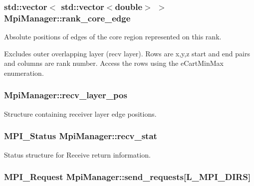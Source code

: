 \subsubsection[{\texorpdfstring{rank\+\_\+core\+\_\+edge}{rank_core_edge}}]{\setlength{\rightskip}{0pt plus 5cm}std\+::vector$<$ std\+::vector$<$double$>$ $>$ Mpi\+Manager\+::rank\+\_\+core\+\_\+edge}\hypertarget{class_mpi_manager_a0211cd784c9ed1514d5968599e794313}{}\label{class_mpi_manager_a0211cd784c9ed1514d5968599e794313}


Absolute positions of edges of the core region represented on this rank. 

Excludes outer overlapping layer (recv layer). Rows are x,y,z start and end pairs and columns are rank number. Access the rows using the e\+Cart\+Min\+Max enumeration. 
\subsubsection[{\texorpdfstring{recv\+\_\+layer\+\_\+pos}{recv_layer_pos}}]{ Mpi\+Manager\+::recv\+\_\+layer\+\_\+pos}\hypertarget{class_mpi_manager_ad1ff57a97ec56efc1690dd3a5a52fd64}{}\label{class_mpi_manager_ad1ff57a97ec56efc1690dd3a5a52fd64}


Structure containing receiver layer edge positions. 

\subsubsection[{\texorpdfstring{recv\+\_\+stat}{recv_stat}}]{\setlength{\rightskip}{0pt plus 5cm}M\+P\+I\+\_\+\+Status Mpi\+Manager\+::recv\+\_\+stat}\hypertarget{class_mpi_manager_a257bc27e8099f1cbf5ac70b80d8eadaa}{}\label{class_mpi_manager_a257bc27e8099f1cbf5ac70b80d8eadaa}


Status structure for Receive return information. 

\subsubsection[{\texorpdfstring{send\+\_\+requests}{send_requests}}]{\setlength{\rightskip}{0pt plus 5cm}M\+P\+I\+\_\+\+Request Mpi\+Manager\+::send\+\_\+requests\mbox{[}{\bf L\+\_\+\+M\+P\+I\+\_\+\+D\+I\+RS}\mbox{]}}\hypertarget{class_mpi_manager_ae4ba6735840e949dff5cd63ab1695ff0}{}\label{class_mpi_manager_ae4ba6735840e949dff5cd63ab1695ff0}


